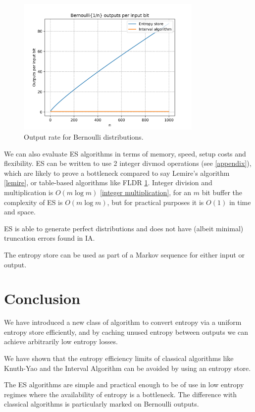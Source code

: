 \documentclass[12pt]{article}
\begin{document}
\begin{figure}[ht]
\centering
\includegraphics[width=0.8\textwidth]{bernoulli_rate.png}
\caption{Output rate for Bernoulli distributions.}
\label{fig:bernoulli-rate}
\end{figure}

We can also evaluate ES algorithms in terms of memory, speed, setup costs and flexibility. ES can be written to use 2 integer divmod operations (see \ref{appendix}), which are likely to prove a bottleneck compared to say Lemire's algorithm \ref{lemire}, or table-based algorithms like FLDR \ref{}. Integer division and multiplication is $O(m \log m)$ \ref{integer multiplication}, for an $m$ bit buffer the complexity of ES is $O(m \log m)$, but for practical purposes it is $O(1)$ in time and space.

ES is able to generate perfect distributions and does not have (albeit minimal) truncation errors found in IA.

The entropy store can be used as part of a Markov sequence for either input or output.

\section{Conclusion}

We have introduced a new class of algorithm to convert entropy via a uniform entropy store efficiently, and by caching unused entropy between outputs we can achieve arbitrarily low entropy losses.

We have shown that the entropy efficiency limits of classical algorithms like Knuth-Yao and the Interval Algorithm can be avoided by using an entropy store. 

The ES algorithms are simple and practical enough to be of use in low entropy regimes where the availability of entropy is a bottleneck. The difference with classical algorithms is particularly marked on Bernoulli outputs.
\end{document}
